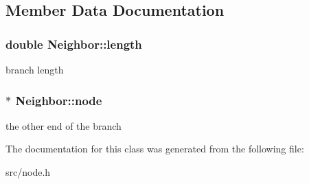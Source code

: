 \subsection{Member Data Documentation}
\hypertarget{classNeighbor_af6ad6ad901efea8b73bca889e2a0a501}{
\subsubsection[{length}]{\setlength{\rightskip}{0pt plus 5cm}double {\bf Neighbor::length}}}
\label{classNeighbor_af6ad6ad901efea8b73bca889e2a0a501}
branch length \hypertarget{classNeighbor_aa3e869eea994f6aa07708d3f326e01cb}{
\subsubsection[{node}]{$\ast$ {\bf Neighbor::node}}}
\label{classNeighbor_aa3e869eea994f6aa07708d3f326e01cb}
the other end of the branch 

The documentation for this class was generated from the following file:\begin{DoxyCompactItemize}
\item 
src/node.h\end{DoxyCompactItemize}
